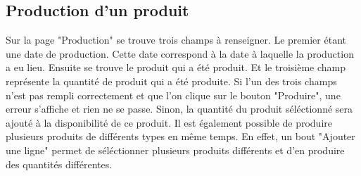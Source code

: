 \subsection{Production d'un produit}
Sur la page "Production" se trouve trois champs à renseigner. Le premier étant 
une date de production. Cette date correspond à la date à laquelle la production 
a eu lieu. Ensuite se trouve le produit qui a été produit. Et le troisième champ 
représente la quantité de produit qui a été produite. Si l'un des trois champs 
n'est pas rempli correctement et que l'on clique sur le bouton "Produire", une 
erreur s'affiche et rien ne se passe. Sinon, la quantité du produit séléctionné 
sera ajouté à la disponibilité de ce produit. Il est également possible de 
produire plusieurs produits de différents types en même temps. En effet, un 
bout "Ajouter une ligne" permet de séléctionner plusieurs produits différents 
et d'en produire des quantités différentes.
